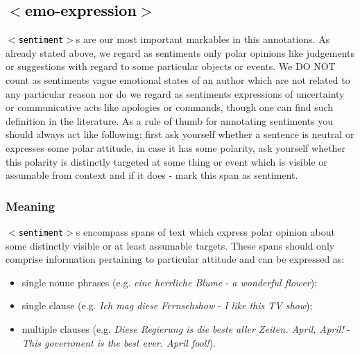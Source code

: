 \documentclass[11pt,a4paper]{article}
\newcommand{\xmltag}[1]{\textcolor{black}{{\small$<$#1$>$}}}
\begin{document}
\subsection{\xmltag{emo-expression}}
\texttt{\xmltag{sentiment}}s are our most important markables in this
annotations. As already stated above, we regard as sentiments only
polar opinions like judgements or suggestions with regard to some
particular objects or events. We DO NOT count as sentiments vague
emotional states of an author which are not related to any particular
reason nor do we regard as sentiments expressions of uncertainty or
communicative acts like apologies or commands, though one can find
such definition in the literature. As a rule of thumb for annotating
sentiments you should always act like following: first ask yourself
whether a sentence is neutral or expresses some polar attitude, in
case it has some polarity, ask yourself whether this polarity is
distinctly targeted at some thing or event which is visible or
assumable from context and if it does - mark this span as sentiment.

\subsubsection{Meaning}

\texttt{\xmltag{sentiment}}s encompass spans of text which express
polar opinion about some distinctly visible or at least assumable
targets. These spans should only comprise information pertaining to
particular attitude and can be expressed as:
\begin{itemize}
  \item single noune phrases (e.g. \textit{eine herrliche Blume} -
    \textit{a wonderful flower});
  \item single clause (e.g. \textit{Ich mag diese Fernsehshow} -
    \textit{I like this TV show});
  \item multiple clauses (e.g. \textit{Diese Regierung is die beste
    aller Zeiten. April, April!} - \textit{This government is the best
    ever. April fool!}).
\end{itemize}
\end{document}
